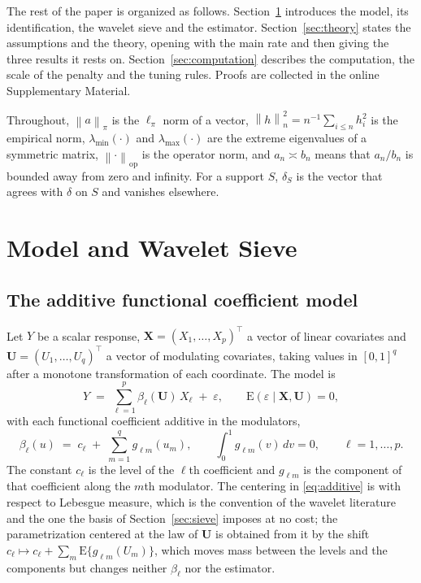 \documentclass[12pt]{article} %
\theoremstyle{definition}
\newcommand{\E}{\mathrm{E}}
\newcommand{\T}{^{\top}}
\newcommand{\norm}[1]{\left\lVert #1 \right\rVert}
\newcommand{\normn}[1]{\left\lVert #1 \right\rVert_{n}}
\newcommand{\cv}{\ell}
\newcommand{\md}{m}
\newcommand{\bX}{\mathbf{X}}
\newcommand{\bU}{\mathbf{U}}
\newcommand{\fcoef}[1]{\beta_{#1}}
\newcommand{\lvl}[1]{c_{#1}}
\newcommand{\gcomp}[2]{g_{#1#2}}
\newcommand{\lmin}{\lambda_{\min}}
\newcommand{\lmaxx}{\lambda_{\max}}
\newcommand{\opnorm}[1]{\left\lVert #1 \right\rVert_{\mathrm{op}}}
\begin{document}
The rest of the paper is organized as follows. Section~\ref{sec:model}
introduces the model, its identification, the wavelet sieve and the estimator.
Section~\ref{sec:theory} states the assumptions and the theory, opening with
the main rate and then giving the three results it rests on.
Section~\ref{sec:computation} describes the computation, the scale of the
penalty and the tuning rules. Proofs are collected in the online Supplementary
Material.

Throughout, $\norm{a}_\pi$ is the $\ell_\pi$ norm of a vector,
$\normn{h}^2 = n^{-1}\sum_{i\le n} h_i^2$ is the empirical norm,
$\lmin(\cdot)$ and $\lmaxx(\cdot)$ are the extreme eigenvalues of a symmetric
matrix, $\opnorm{\cdot}$ is the operator norm, and $a_n \asymp b_n$ means that
$a_n/b_n$ is bounded away from zero and infinity. For a support
$S$, $\delta_S$ is the vector that agrees with $\delta$ on $S$ and vanishes
elsewhere.

\section{Model and Wavelet Sieve}
\label{sec:model}

\subsection{The additive functional coefficient model}
\label{sec:model-def}

Let $Y$ be a scalar response, $\bX = (X_1,\dots,X_p)\T$ a vector of linear
covariates and $\bU = (U_1,\dots,U_q)\T$ a vector of modulating covariates,
taking values in $[0,1]^q$ after a monotone transformation of each
coordinate. The model is
\begin{equation}
  \label{eq:model}
  Y \;=\; \sum_{\cv=1}^{p} \fcoef{\cv}(\bU)\,X_{\cv} \;+\; \varepsilon,
  \qquad \E(\varepsilon \mid \bX, \bU) = 0,
\end{equation}
with each functional coefficient additive in the modulators,
\begin{equation}
  \label{eq:additive}
  \fcoef{\cv}(u) \;=\; \lvl{\cv} \;+\; \sum_{\md=1}^{q}\gcomp{\cv}{\md}(u_{\md}),
  \qquad \int_{0}^{1}\gcomp{\cv}{\md}(v)\,dv = 0,
  \qquad \cv = 1,\dots,p .
\end{equation}
The constant $\lvl{\cv}$ is the level of the $\cv$th coefficient and
$\gcomp{\cv}{\md}$ is the component of that coefficient along the $\md$th
modulator. The centering in \eqref{eq:additive} is with respect to Lebesgue
measure, which is the convention of the wavelet literature and the one the
basis of Section~\ref{sec:sieve} imposes at no cost; the parametrization
centered at the law of $\bU$ is obtained from it by the shift
$\lvl{\cv} \mapsto \lvl{\cv} + \sum_{\md}\E\{\gcomp{\cv}{\md}(U_{\md})\}$,
which moves mass between the levels and the components but changes neither
$\fcoef{\cv}$ nor the estimator.
\end{document}
